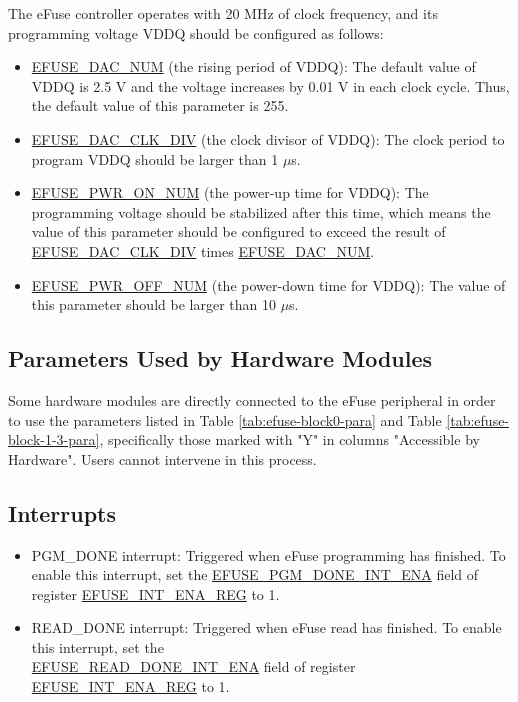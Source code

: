\documentclass[main\_\_EN.tex]{subfiles}
\begin{document}
The eFuse controller operates with 20 MHz of clock frequency, and its programming voltage VDDQ should be configured as follows:

\begin{itemize}
    \item \hyperref[fielddesc:EFUSEDACNUM]{EFUSE\_DAC\_NUM} (the rising period of VDDQ): The default value of VDDQ is 2.5 V and the voltage increases by 0.01 V in each clock cycle. Thus, the default value of this parameter is 255.
    \item \hyperref[fielddesc:EFUSEDACCLKDIV]{EFUSE\_DAC\_CLK\_DIV} (the clock divisor of VDDQ): The clock period to program VDDQ should be larger than 1 $\mu$s.
    \item \hyperref[fielddesc:EFUSEPWRONNUM]{EFUSE\_PWR\_ON\_NUM} (the power-up time for VDDQ): The programming voltage should be stabilized after this time, which means the value of this parameter should be configured to exceed the result of \hyperref[fielddesc:EFUSEDACCLKDIV]{EFUSE\_DAC\_CLK\_DIV} times \hyperref[fielddesc:EFUSEDACNUM]{EFUSE\_DAC\_NUM}.
    \item \hyperref[fielddesc:EFUSEPWROFFNUM]{EFUSE\_PWR\_OFF\_NUM} (the power-down time for VDDQ): The value of this parameter should be larger than 10 $\mu$s.
\end{itemize}




\subsection{Parameters Used by Hardware Modules}

Some hardware modules are directly connected to the eFuse peripheral in order to use the parameters listed in Table \ref{tab:efuse-block0-para} and Table \ref{tab:efuse-block-1-3-para}, specifically those marked with "Y" in columns "Accessible by Hardware". Users cannot intervene in this process.

\subsection{Interrupts}
\begin{itemize}
\item PGM\_DONE interrupt: Triggered when eFuse programming has finished. To enable this interrupt, set the \hyperref[fielddesc:EFUSEPGMDONEINTENA]{EFUSE\_PGM\_DONE\_INT\_ENA} field of register \hyperref[regdesc:EFUSEINTENAREG]{EFUSE\_INT\_ENA\_REG} to 1.
\item READ\_DONE interrupt: Triggered when eFuse read has finished. To enable this interrupt, set the \\\hyperref[fielddesc:EFUSEREADDONEINTENA]{EFUSE\_READ\_DONE\_INT\_ENA} field of register \hyperref[regdesc:EFUSEINTENAREG]{EFUSE\_INT\_ENA\_REG} to 1.
\end{itemize}
\end{document}
